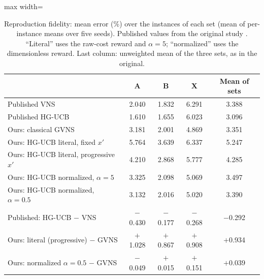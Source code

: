 \begin{table}[t]
\caption{Reproduction fidelity: mean error (\%) over the instances of each set (mean of per-instance means over five seeds). Published values from the original study \citep{kalatzantonakis2023}. ``Literal'' uses the raw-cost reward and $\alpha=5$; ``normalized'' uses the dimensionless reward. Last column: unweighted mean of the three sets, as in the original.}\label{tab:repro}
\centering
\small
\begin{adjustbox}{max width=\linewidth}
\begin{tabular}{lcccc}
\toprule
 & A & B & X & Mean of sets \\
\midrule
Published VNS & 2.040 & 1.832 & 6.291 & 3.388 \\
Published HG-UCB & 1.610 & 1.655 & 6.023 & 3.096 \\
\addlinespace
Ours: classical GVNS & 3.181 & 2.001 & 4.869 & 3.351 \\
Ours: HG-UCB literal, fixed $x'$ & 5.764 & 3.639 & 6.337 & 5.247 \\
Ours: HG-UCB literal, progressive $x'$ & 4.210 & 2.868 & 5.777 & 4.285 \\
Ours: HG-UCB normalized, $\alpha=5$ & 3.325 & 2.098 & 5.069 & 3.497 \\
Ours: HG-UCB normalized, $\alpha=0.5$ & 3.132 & 2.016 & 5.020 & 3.390 \\
\midrule
Published: HG-UCB $-$ VNS & $-$0.430 & $-$0.177 & $-$0.268 & $-$0.292 \\
Ours: literal (progressive) $-$ GVNS & $+$1.028 & $+$0.867 & $+$0.908 & $+$0.934 \\
Ours: normalized $\alpha=0.5$ $-$ GVNS & $-$0.049 & $+$0.015 & $+$0.151 & $+$0.039 \\
\bottomrule
\end{tabular}
\end{adjustbox}
\end{table}
